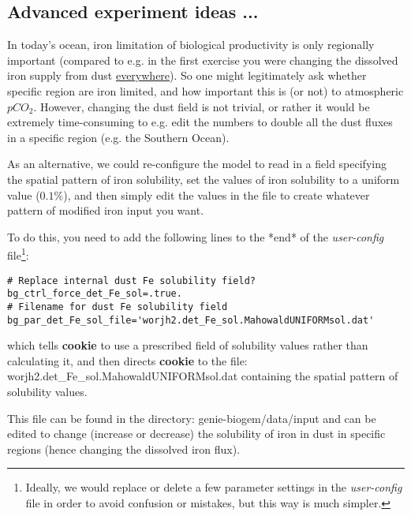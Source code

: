 \newpage 

\subsection{Advanced experiment ideas ...}

In today's ocean, iron limitation of biological productivity is only regionally important (compared to e.g. in the first exercise you were changing the dissolved iron supply from dust \uline{everywhere}). So one might legitimately ask whether specific region are iron limited, and how important this is (or not) to atmospheric \(pCO_{2}\). However, changing the dust field is not trivial, or rather it would be extremely time-consuming to e.g. edit the numbers to double all the dust fluxes in a specific region (e.g. the Southern Ocean).

\vspace{1mm}
As an alternative, we could re-configure the model to read in a field specifying the spatial pattern of iron solubility, set the values of iron solubility to a uniform value (\(0.1\%\)), and then simply edit the values in the file to create whatever pattern of modified iron input you want.

%
To do this, you need to add the following lines to the *end* of the \textit{user-config} file\footnote{Ideally, we would replace or delete a few parameter settings in the \textit{user-config} file in order to avoid confusion or mistakes, but this way is much simpler.}:

\vspace{-1mm}\small\begin{verbatim}
# Replace internal dust Fe solubility field?
bg_ctrl_force_det_Fe_sol=.true.
# Filename for dust Fe solubility field
bg_par_det_Fe_sol_file='worjh2.det_Fe_sol.MahowaldUNIFORMsol.dat'
\end{verbatim}\normalsize\vspace{-1mm}
which tells \textbf{cookie} to use a prescribed field of solubility values rather than calculating it, and then directs \textbf{cookie} to the file: \textsf{\footnotesize worjh2.det\_Fe\_sol.MahowaldUNIFORMsol.dat} containing the spatial pattern of solubility values.

\vspace{1mm}
This file can be found in the directory: \textsf{\footnotesize genie-biogem/data/input} and can be edited to change (increase or decrease) the solubility of iron in dust in specific regions (hence changing the dissolved iron flux). 

